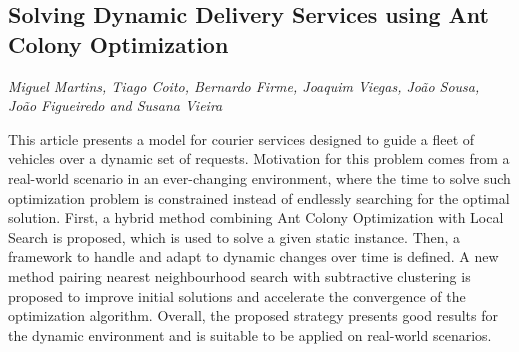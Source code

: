 \documentclass[../booklet.tex]{subfiles}
\begin{document}
\subsection[Solving Dynamic Delivery Services using Ant Colony Optimization. {\it Miguel Martins, Tiago Coito, Bernardo Firme, Joaquim Viegas, João Sousa, João Figueiredo and Susana Vieira}]{Solving Dynamic Delivery Services using Ant Colony Optimization}
      

\begin{center}
  {\it Miguel Martins, Tiago Coito, Bernardo Firme, Joaquim Viegas, João Sousa, João Figueiredo and Susana Vieira}
\end{center}

\vskip 0.8cm


This article presents a model for courier services designed to guide a fleet of vehicles over a dynamic set of requests.
Motivation for this problem comes from a real-world scenario in an ever-changing environment, where the time to solve such optimization problem is constrained instead of  endlessly searching for the optimal solution. 
First, a hybrid method combining Ant Colony Optimization with Local Search is proposed, which is used to solve a given static instance.
Then, a framework to handle and adapt to dynamic changes over time is defined. 
A new method pairing nearest neighbourhood search with subtractive clustering is proposed to improve initial solutions and accelerate the convergence of the optimization algorithm.
Overall, the proposed strategy presents good results for the dynamic environment and is suitable to be applied on real-world scenarios.

\end{document}
